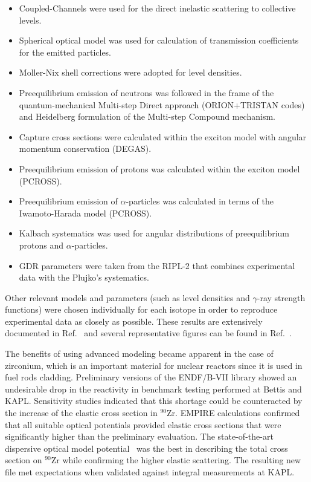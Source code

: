 \begin{itemize}
\item Coupled-Channels were used for the direct inelastic scattering to
collective levels.

\item Spherical optical model was used for calculation of transmission
coefficients for the emitted particles.

\item Moller-Nix shell corrections were adopted for level densities.

\item Preequilibrium emission of neutrons was followed in the frame of the
quantum-mechanical Multi-step Direct approach (ORION+TRISTAN codes) and
Heidelberg formulation of the Multi-step Compound mechanism.

\item Capture cross sections were calculated within the exciton model with
angular momentum conservation (DEGAS).

\item Preequilibrium emission of protons was calculated within the exciton
model (PCROSS).

\item Preequilibrium emission of $\alpha$-particles was calculated in terms
of the Iwamoto-Harada model (PCROSS).

\item Kalbach systematics was used for angular distributions of
preequilibrium protons and $\alpha$-particles.

\item GDR parameters were taken from the RIPL-2 that combines experimental
data with the Plujko's systematics.
\end{itemize}

\noindent Other relevant models and parameters (such as level densities and $%
\gamma$-ray strength functions) were chosen individually for each isotope in
order to reproduce experimental data as closely as possible. These results
are extensively documented in Ref.~\cite{Kim:07} and several representative
figures can be found in Ref.~\cite{ENDF-VII}.

The benefits of using advanced modeling became apparent in the case of
zirconium, which is an important material for nuclear reactors since it is
used in fuel rods cladding. Preliminary versions of the ENDF/B-VII library
showed an undesirable drop in the reactivity in benchmark testing performed
at Bettis and KAPL. Sensitivity studies indicated that this shortage could
be counteracted by the increase of the elastic cross section in $^{90}$Zr.
EMPIRE calculations confirmed that all suitable optical potentials provided
elastic cross sections that were significantly higher than the preliminary
evaluation. The state-of-the-art dispersive optical model potential~\cite%
{Capote:06, Capote:05, Soukhovitskii:05} was the best in describing the
total cross section on $^{90}$Zr while confirming the higher elastic
scattering. The resulting new file met expectations when validated against
integral measurements at KAPL.

